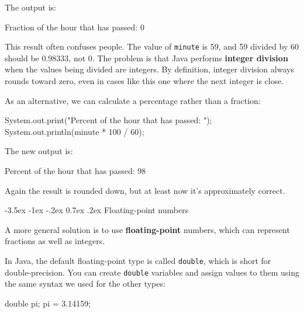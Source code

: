 \documentclass[12pt]{book}
\makeatletter
\theoremstyle{exercise}
\newcommand{\java}[1]{\verb"#1"}
\renewcommand{\section}{\@startsection{section}{1}{\z@}%
    {-3.5ex \@plus -1ex \@minus -.2ex}%
    {0.7ex \@plus.2ex}%
    {\normalfont\Large\bfseries}}
\newcommand{\java}[1]{\lstinline{#1}} %
\makeatother
\begin{document}
The output is:

\begin{stdout}
Fraction of the hour that has passed: 0
\end{stdout}


This result often confuses people.
The value of \java{minute} is 59, and 59 divided by 60 should be 0.98333, not 0.
The problem is that Java performs {\bf integer division} when the values being divided are integers.
By definition, integer division always rounds toward zero, even in cases like this one where the next integer is close.

As an alternative, we can calculate a percentage rather than a fraction:

\begin{code}
    System.out.print("Percent of the hour that has passed: ");
    System.out.println(minute * 100 / 60);
\end{code}

The new output is:

\begin{stdout}
Percent of the hour that has passed: 98
\end{stdout}

Again the result is rounded down, but at least now it's approximately correct.


\section{Floating-point numbers}


A more general solution is to use {\bf floating-point} numbers, which can represent fractions as well as integers.

In Java, the default floating-point type is called \java{double}, which is short for double-precision.
You can create \java{double} variables and assign values to them using the same syntax we used for the other types:

\begin{code}
    double pi;
    pi = 3.14159;
\end{code}
\end{document}
